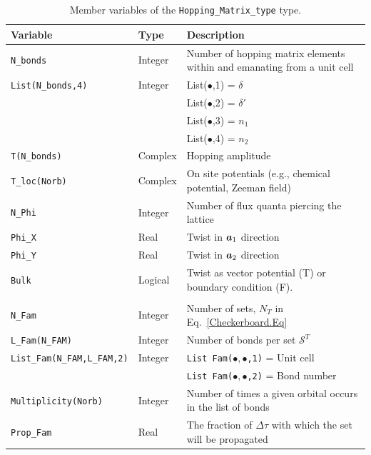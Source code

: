 \begin{table}[h]
	\begin{center}
		\begin{tabular}{@{} p{} @{} p{} p{} @{}}\toprule
			Variable & Type & Description \\\midrule
			\texttt{N\_bonds}  &  Integer  &      Number of  hopping  matrix elements within and  emanating from   a unit cell   \\
			\texttt{List(N\_bonds,4)}    & Integer &  List($\bullet$,1) =   $\delta$ \\
			&              &  List($\bullet$,2) =   $\delta'$ \\
			&              &  List($\bullet$,3) =   $n_1$     \\
			&              &  List($\bullet$,4) =   $n_2$     \\ 
			\texttt{T(N\_bonds)}          & Complex &   Hopping amplitude   \\
			\texttt{T\_loc(Norb)}           & Complex &    On site  potentials (e.g., chemical potential, Zeeman field)   \\
			\texttt{N\_Phi}                    & Integer     &  Number of  flux quanta piercing the lattice   \\
			\texttt{Phi\_X}                    &  Real        &   Twist in $\boldsymbol{a}_1$  direction   \\
			\texttt{Phi\_Y}                    &  Real        &   Twist in $\boldsymbol{a}_2$  direction   \\
			\texttt{Bulk}                        &   Logical   &   Twist as vector potential (T) or  boundary condition (F).
			\\  \\
			\texttt{N\_Fam}                &  Integer  &      Number of  sets, $N_T$ in Eq.~\eqref{Checkerboard.Eq}   \\
			\texttt{L\_Fam(N\_FAM)}  &  Integer &     Number of bonds per set $\mathcal{S}^{T}$ \\    
			\texttt{List\_Fam(N\_FAM,L\_FAM,2)}     &  Integer  &   \texttt{List Fam($ \bullet,\bullet $,1)} =  Unit cell \\
			&                        &          \texttt{List Fam($\bullet,\bullet$,2)} =   Bond number \\
			\texttt{Multiplicity(Norb)} & Integer           &        Number of  times a  given orbital  occurs in the list of bonds  \\
			\texttt{Prop\_Fam} &  Real            &         The fraction of $ \Delta \tau $   with which the set will be propagated   \                                
			\\\bottomrule
		\end{tabular}
		\caption{Member variables of the \texttt{Hopping\_Matrix\_type}  type.   
			\label{table:Hopping_matrix}}
	\end{center}
\end{table}

